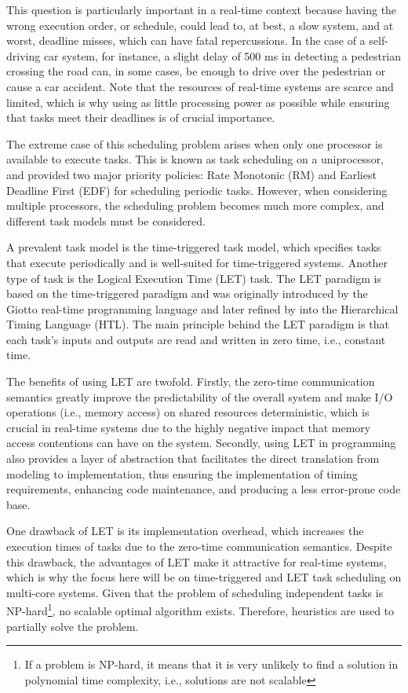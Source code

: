This question is particularly important in a real-time context 
because having the wrong execution order, or schedule, could lead 
to, at best, a slow system, and at worst, deadline misses, which 
can have fatal repercussions. In the case of a self-driving car 
system, for instance, a slight delay of 500 ms in detecting a pedestrian 
crossing the road can, in some cases, be enough to drive over 
the pedestrian or cause a car accident. Note that the resources of 
real-time systems are scarce and limited, which is why using as 
little processing power as possible while ensuring that tasks meet 
their deadlines is of crucial importance.

The extreme case of this scheduling problem arises when only one 
processor is available to execute tasks. This is known as task 
scheduling on a uniprocessor, and \cite{liu1973scheduling} 
provided two major priority policies: Rate Monotonic (RM) and 
Earliest Deadline First (EDF) for scheduling periodic tasks. 
However, when considering multiple processors, the scheduling 
problem becomes much more complex, and different task models must 
be considered.

A prevalent task model is the time-triggered task model, 
which specifies tasks that execute periodically and is well-suited 
for time-triggered systems. Another type of task is the Logical 
Execution Time (LET) task. The LET paradigm is based on the 
time-triggered paradigm and was originally introduced by the 
Giotto real-time programming language\cite{henzinger2003giotto} and 
later refined by \cite{henzinger2009distributed} into the 
Hierarchical Timing Language (HTL). The main principle behind the 
LET paradigm is that each task's inputs and outputs are read and 
written in zero time, i.e., constant time.

The benefits of using LET are twofold. Firstly, the zero-time 
communication semantics greatly improve the predictability of the 
overall system and make I/O operations (i.e., memory access) on 
shared resources deterministic, which is crucial in real-time 
systems due to the highly negative impact that memory access 
contentions can have on the system\cite{nagalakshmi2016impact}. 
Secondly, using LET in programming also provides a layer of 
abstraction that facilitates the direct translation from modeling 
to implementation, thus ensuring the implementation of timing 
requirements, enhancing code maintenance, and producing a less 
error-prone code base\cite{kirsch2012logical}.

One drawback of LET is its implementation overhead, which increases 
the execution times of tasks due to the zero-time communication 
semantics\cite{biondi2018LETruntimeoverhead}. Despite this drawback, 
the advantages of LET make it attractive for real-time systems\cite{gemlau2021systemLET}, 
which is why the focus here will be on time-triggered and LET 
task scheduling on multi-core systems. Given that the problem of 
scheduling independent tasks is NP-hard\footnote{If a problem is 
NP-hard, it means that it is very unlikely to find a solution in 
polynomial time complexity, i.e., solutions are not scalable}\cite{du1989schedNPhard}, 
no scalable optimal algorithm exists. Therefore, heuristics are 
used to partially solve the problem.

